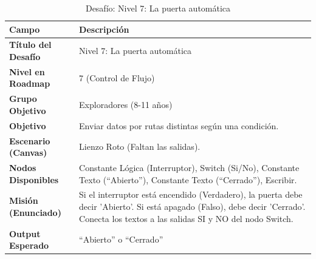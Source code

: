 \begin{table}[H]
    \centering
    \caption{Desafío: Nivel 7: La puerta automática}
    \label{tab:desafio-exp-7}
    \begingroup
    \renewcommand{\arraystretch}{\TableRowStretch}
    \begin{tabularx}{\textwidth}{ l X }
        \hline
        \textbf{Campo}              & \textbf{Descripción}                                                                                                                                                                   \\
        \hline
        \textbf{Título del Desafío} & Nivel 7: La puerta automática                                                                                                                                                          \\
        \textbf{Nivel en Roadmap}   & 7 (Control de Flujo)                                                                                                                                                                   \\
        \textbf{Grupo Objetivo}     & Exploradores (8-11 años)                                                                                                                                                               \\
        \textbf{Objetivo}           & Enviar datos por rutas distintas según una condición.                                                                                                                                  \\
        \textbf{Escenario (Canvas)} & Lienzo Roto (Faltan las salidas).                                                                                                                                                      \\
        \textbf{Nodos Disponibles}  & Constante Lógica (Interruptor), Switch (Si/No), Constante Texto (“Abierto”), Constante Texto (“Cerrado”), Escribir.                                                                    \\
        \textbf{Misión (Enunciado)} & Si el interruptor está encendido (Verdadero), la puerta debe decir 'Abierto'. Si está apagado (Falso), debe decir 'Cerrado'. Conecta los textos a las salidas SI y NO del nodo Switch. \\
        \textbf{Output Esperado}    & “Abierto” o “Cerrado”                                                                                                                                                                  \\
        \hline
    \end{tabularx}
    \endgroup
\end{table}

